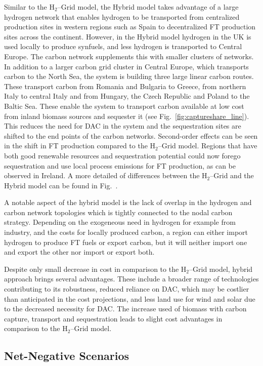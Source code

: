 \documentclass[twocolumn]{article}
\newcommand{\hydrogen}{H$_2$}
\newcommand{\hydrogengrid}{\hydrogen{}--Grid}
\begin{document}
Similar to the \hydrogengrid{} model, the Hybrid model takes advantage of a large hydrogen network that enables hydrogen to be transported from centralized production sites in western regions such as Spain to decentralized FT production sites across the continent. However, in the Hybrid model hydrogen in the UK is used locally to produce synfuels, and less hydrogen is transported to Central Europe.
The carbon network supplements this with smaller clusters of networks. In addition to a larger carbon grid cluster in Central Europe, which transports carbon to the North Sea, the system is building three large linear carbon routes. These transport carbon from Romania and Bulgaria to Greece, from northern Italy to central Italy and from Hungary, the Czech Republic and Poland to the Baltic Sea. These enable the system to transport carbon available at low cost from inland biomass sources and sequester it (see Fig.~\ref{fig:captureshare_line}). This reduces the need for DAC in the system and the sequestration sites are shifted to the end points of the carbon networks. Second-order effects can be seen in the shift in FT production compared to the \hydrogengrid{} model. Regions that have both good renewable resources and sequestration potential could now forego sequestration and use local process emissions for FT production, as can be observed in Ireland. A more detailed of differences between the \hydrogengrid{} and the Hybrid model can be found in Fig.~.


A notable aspect of the hybrid model is the lack of overlap in the hydrogen and carbon network topologies which is tightly connected to the nodal carbon strategy. Depending on the exogeneous need in hydrogen for example from industry, and the costs for locally produced carbon, a region can either import hydrogen to produce FT fuels or export carbon, but it will neither import one and export the other nor import or export both.


Despite only small decrease in cost in comparison to the \hydrogengrid{} model, hybrid approach brings several advantages. These include a broader range of technologies contributing to its robustness, reduced reliance on DAC, which may be costlier than anticipated in the cost projections, and less land use for wind and solar due to the decreased necessity for DAC. The increase used of biomass with carbon capture, transport and sequestration leads to slight cost advantages in comparison to the \hydrogengrid{} model.



\subsection*{Net-Negative Scenarios}
\end{document}
